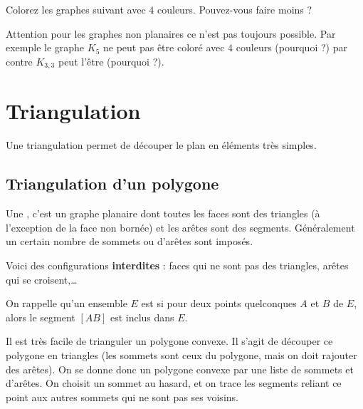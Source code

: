 \documentclass[11pt,class=report,crop=false]{standalone}
\begin{document}
Colorez les graphes suivant avec $4$ couleurs. Pouvez-vous faire moins ?


Attention pour les graphes non planaires ce n'est pas toujours possible. Par exemple le graphe $K_5$ ne peut pas être coloré avec $4$ couleurs (pourquoi ?) par contre $K_{3,3}$ peut l'être (pourquoi ?). 



\section{Triangulation}


Une triangulation permet de découper le plan en éléments très simples.

\subsection{Triangulation d'un polygone}

Une , c'est un graphe planaire dont toutes les faces sont des triangles (à l'exception de la face non bornée) et les arêtes sont des segments.
Généralement un certain nombre de sommets ou d'arêtes sont imposés.



Voici des configurations \textbf{interdites} : faces qui ne sont pas des triangles, arêtes qui se croisent,\ldots
{}


\medskip


On rappelle qu'un ensemble $E$ est  si pour deux points quelconques $A$ et $B$ de $E$, alors le segment $[AB]$ est inclus dans $E$.


\medskip

Il est très facile de trianguler un polygone convexe. Il s'agit de découper ce polygone en triangles (les sommets sont ceux du polygone, mais on doit rajouter des arêtes).
On se donne donc un polygone convexe par une liste de sommets et d'arêtes.
On choisit un sommet au hasard, et on trace les segments reliant ce point aux autres sommets qui ne sont pas ses voisins.
\end{document}
